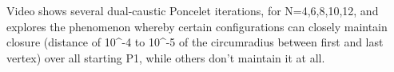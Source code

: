 Video shows several dual-caustic Poncelet iterations, for N=4,6,8,10,12, and explores the phenomenon whereby certain configurations can closely maintain closure (distance of 10^-4 to 10^-5 of the circumradius between first and last vertex) over all starting P1, while others don't maintain it at all.
